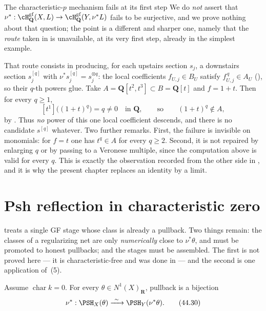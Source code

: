 \begin{warning}{The characteristic-$p$ mechanism fails at its first step}
\label{warn:ch44-no-gf-bijection}
We do \emph{not} assert that
$\nu^*:\cH^{\mathrm{gf}}_{\mathbf Q}(X,L)\to
 \cH^{\mathrm{gf}}_{\mathbf Q}(Y,\nu^*L)$ fails to be surjective, and we
prove nothing about that question; the point is a different and sharper one,
namely that the \emph{route} taken in
 is unavailable, at its very first step,
already in the simplest example.

That route consists in producing, for each upstairs section $s_j$, a
downstairs section $s_j^{[q]}$ with
$\nu^*s_j^{[q]}=s_j^{\otimes q}$: the local coefficients
$f_{U,j}\in B_U$ satisfy $f_{U,j}^{\,q}\in A_U$
(), so their $q$-th powers glue.
Take $A=\mathbf Q[t^2,t^3]\subset B=\mathbf Q[t]$ and $f=1+t$.  Then for
every $q\ge1$,
\[
 [t^1]\bigl((1+t)^q\bigr)=q\neq0
 \quad\text{in }\mathbf Q,
 \qquad\text{so}\qquad
 (1+t)^q\notin A,
\]
by .  Thus \emph{no} power of this one
local coefficient descends, and there is no candidate $s^{[q]}$ whatever.
Two further remarks.  First, the failure is invisible on monomials: for
$f=t$ one has $t^q\in A$ for every $q\ge2$.  Second, it is not
repaired by enlarging $q$ or by passing to a Veronese multiple, since the
computation above is valid for every $q$.  This is exactly the
observation recorded from the other side in
, and it is why the present chapter
replaces an identity by a limit.
\end{warning}

\section{Psh reflection in characteristic zero}
\label{sec:ch44-reflection}

 treats a single GF stage whose
class is already a pullback.  Two things remain: the classes of a
regularizing net are only \emph{numerically} close to $\nu^*\theta$, and
must be promoted to honest pullbacks; and the stages must be assembled.  The
first is not proved here --- it is characteristic-free and was done in
 --- and the second is one
application of \,(5).

\begin{theorem}\label{thm:bj-char-zero-universal-reflection}
Assume $\operatorname{char}k=0$.
For every $\theta\in N^1(X)_{\mathbf R}$, pullback is a bijection
\[
 \nu^*:\PSH_X(\theta)
       \xrightarrow{\ \sim\ }
       \PSH_Y(\nu^*\theta).
\tag{44.30}\label{eq:bj-char-zero-universal-reflection}
\]
\end{theorem}

